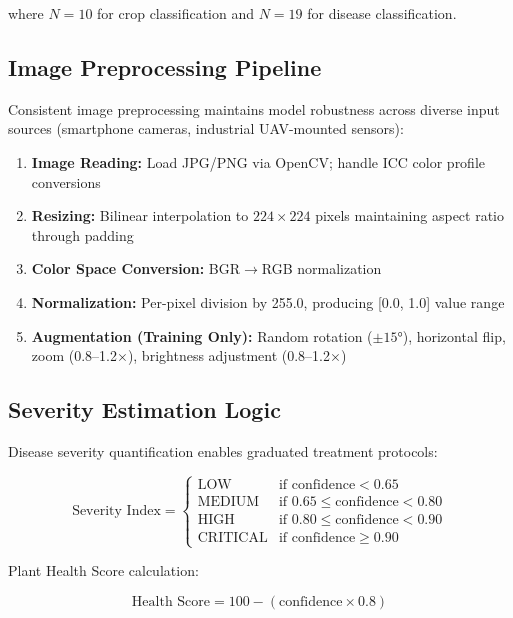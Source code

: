 \documentclass[conference]{IEEEtran}
\begin{document}
where $N=10$ for crop classification and $N=19$ for disease classification.

\subsection{Image Preprocessing Pipeline}

Consistent image preprocessing maintains model robustness across diverse input sources (smartphone cameras, industrial UAV-mounted sensors):

\begin{enumerate}
\item \textbf{Image Reading:} Load JPG/PNG via OpenCV; handle ICC color profile conversions
\item \textbf{Resizing:} Bilinear interpolation to $224 \times 224$ pixels maintaining aspect ratio through padding
\item \textbf{Color Space Conversion:} BGR$\rightarrow$RGB normalization
\item \textbf{Normalization:} Per-pixel division by 255.0, producing [0.0, 1.0] value range
\item \textbf{Augmentation (Training Only):} Random rotation ($\pm 15°$), horizontal flip, zoom (0.8--1.2$\times$), brightness adjustment (0.8--1.2$\times$)
\end{enumerate}

\subsection{Severity Estimation Logic}

Disease severity quantification enables graduated treatment protocols:

\begin{equation}
\text{Severity Index} = 
\begin{cases}
\text{LOW} & \text{if } \text{confidence} < 0.65 \\
\text{MEDIUM} & \text{if } 0.65 \leq \text{confidence} < 0.80 \\
\text{HIGH} & \text{if } 0.80 \leq \text{confidence} < 0.90 \\
\text{CRITICAL} & \text{if } \text{confidence} \geq 0.90
\end{cases}
\end{equation}

Plant Health Score calculation:

\begin{equation}
\text{Health Score} = 100 - (\text{confidence} \times 0.8)
\end{equation}
\end{document}
